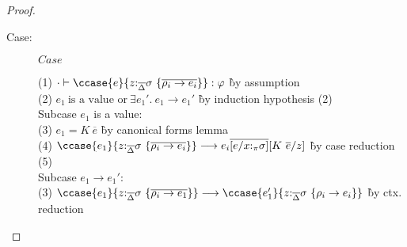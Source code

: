 \begin{proof}
\begin{description}
\item[Case:] $Case$
\begin{tabbing}
(1) $\cdot \vdash \ccase{e}{z{:}_{\overline{\Delta}}\sigma~\{\overline{\rho_i \to e_i}\}} : \varphi$ \` by assumption \\
(2) $e_1~\textrm{is a value or}~\exists e_1'.~e_1 \longrightarrow e_1'$ \` by induction hypothesis (2) \\
\textrm{Subcase $e_1$ is a value:}\\
(3) $e_1 = K~\overline{e}$ \` by canonical forms lemma \\
(4) $\ccase{e_1}{z{:}_{\overline{\Delta}}\sigma~\{\overline{\rho_i \to e_i}\}} \longrightarrow e_i\overline{[e/x{:}_\pi\sigma]}[K~\overline{e}/z]$ \` by case reduction (5) \\
\textrm{Subcase $e_1 \to e_1'$:}\\
(3) $\ccase{e_1}{z{:}_{\overline{\Delta}}\sigma~\{\overline{\rho_i \to e_1}\}}
  \longrightarrow \ccase{e_1'}{z{:}_{\overline{\Delta}}\sigma~\{\rho_i \to e_i\}}$ \` by ctx. reduction\\
\end{tabbing}

\end{description}

\end{proof}

